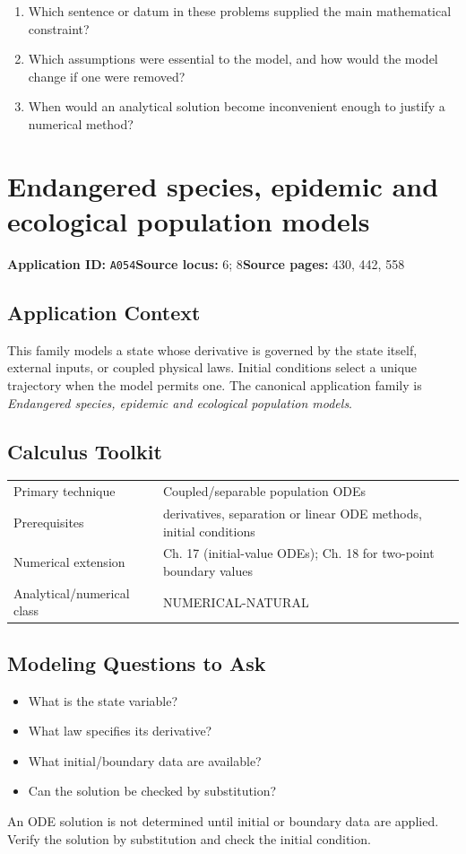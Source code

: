 \documentclass[11pt]{book}
\newcommand{\pid}[1]{\texttt{#1}}
\begin{document}
\begin{reflectionbox}\begin{enumerate}
\item Which sentence or datum in these problems supplied the main mathematical constraint?
\item Which assumptions were essential to the model, and how would the model change if one were removed?
\item When would an analytical solution become inconvenient enough to justify a numerical method?
\end{enumerate}\end{reflectionbox}
\chapter{Endangered species, epidemic and ecological population models}\label{app:A054}
\textbf{Application ID:} \pid{A054}\quad \textbf{Source locus:} 6; 8\quad \textbf{Source pages:} 430, 442, 558
\section*{Application Context}
This family models a state whose derivative is governed by the state itself, external inputs, or coupled physical laws. Initial conditions select a unique trajectory when the model permits one. The canonical application family is \emph{Endangered species, epidemic and ecological population models}.
\section*{Calculus Toolkit}
\begin{tabularx}{\textwidth}{@{}lX@{}}\toprule
Primary technique & Coupled/separable population ODEs \\
Prerequisites & derivatives, separation or linear ODE methods, initial conditions \\
Numerical extension & Ch. 17 (initial-value ODEs); Ch. 18 for two-point boundary values \\
Analytical/numerical class & NUMERICAL-NATURAL \\
\bottomrule\end{tabularx}
\section*{Modeling Questions to Ask}\begin{itemize}
\item What is the state variable?
\item What law specifies its derivative?
\item What initial/boundary data are available?
\item Can the solution be checked by substitution?
\end{itemize}
\begin{errorbox}An ODE solution is not determined until initial or boundary data are applied. Verify the solution by substitution and check the initial condition.\end{errorbox}
\end{document}
